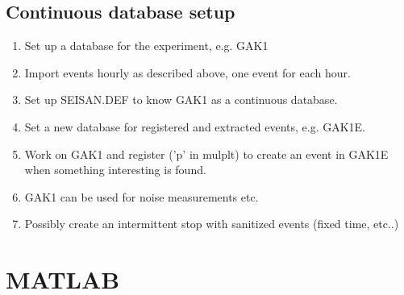 \documentclass[a4paper]{article}
\begin{document}
\begin{multicols}{2}
      \subsection{Continuous database setup}
      \begin{enumerate}
        \item Set up a database for the experiment, e.g. GAK1
        \item Import events hourly as described above, one event for
          each hour.
        \item Set up SEISAN.DEF to know GAK1 as a continuous database.
        \item Set a new database for registered and extracted events, e.g. GAK1E.
        \item Work on GAK1 and register ('p' in mulplt) to create an
          event in GAK1E when something interesting is found.
        \item GAK1 can be used for noise measurements etc.
        \item Possibly create an intermittent stop with sanitized events
          (fixed time, etc..)
      \end{enumerate}
  \section{MATLAB}


\end{multicols}
\end{document}
